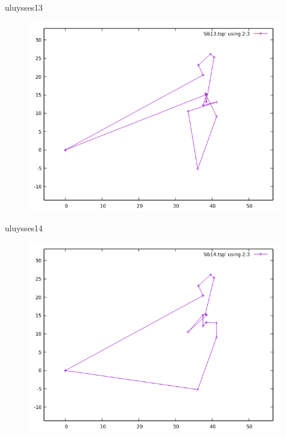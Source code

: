 \documentclass{beamer}
\begin{document}
\begin{frame}[fragile]{uluysses13}
\begin{figure}[H]
\centering
\includegraphics[scale=0.5]{bb13.png}
\end{figure}
\end{frame}

\begin{frame}[fragile]{uluysses14}
\begin{figure}[H]
\centering
\includegraphics[scale=0.5]{bb14.png}
\end{figure}
\end{frame}
\end{document}
